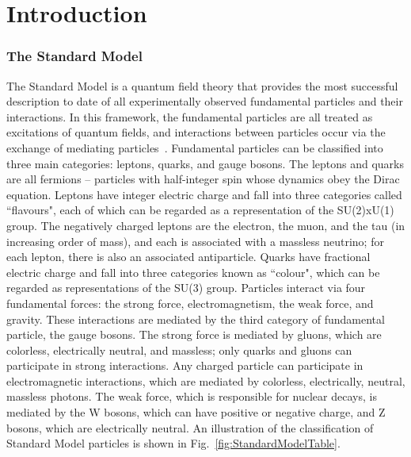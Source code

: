 \chapter{Introduction\label{sec:intro}}



\subsection{The Standard Model\label{sec:SM}}

The Standard Model is a quantum field theory that provides the most successful description to date of all experimentally observed fundamental particles and their interactions. In this framework, the fundamental particles are all treated as excitations of quantum fields, and interactions between particles occur via the exchange of mediating particles~\cite{BettiniPhysics}.
Fundamental particles can be classified into three main categories: leptons, quarks, and gauge bosons. The leptons and quarks are all fermions -- particles with half-integer spin whose dynamics obey the Dirac equation. Leptons have integer electric charge and fall into three categories called ``flavours", each of which can be regarded as a representation of the SU(2)xU(1) group. The negatively charged leptons are the electron, the muon, and the tau (in increasing order of mass), and each is associated with a massless neutrino; for each lepton, there is also an associated antiparticle. Quarks have fractional electric charge and fall into three categories known as ``colour", which can be regarded as representations of the SU(3) group.
Particles interact via four fundamental forces: the strong force, electromagnetism, the weak force, and gravity. These interactions are mediated by the third category of fundamental particle, the gauge bosons. The strong force is mediated by gluons, which are colorless, electrically neutral, and massless; only quarks and gluons can participate in strong interactions. Any charged particle can participate in electromagnetic interactions, which are mediated by colorless, electrically, neutral, massless photons. The weak force, which is responsible for nuclear decays, is mediated by the W bosons, which can have positive or negative charge, and Z bosons, which are electrically neutral.
An illustration of the classification of Standard Model particles is shown in Fig.~\ref{fig:StandardModelTable}.

